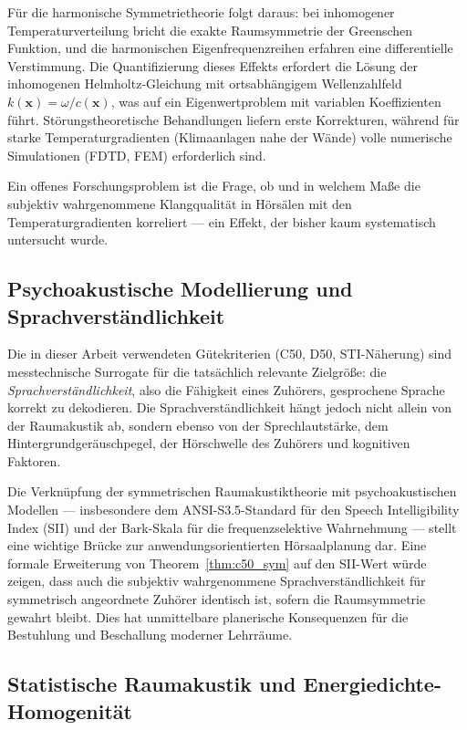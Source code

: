 ﻿\documentclass[12pt, a4paper]{article}
\theoremstyle{definition}
\theoremstyle{remark}
\begin{document}
Für die harmonische Symmetrietheorie folgt daraus: bei inhomogener
Temperaturverteilung bricht die exakte Raumsymmetrie der Greenschen
Funktion, und die harmonischen Eigenfrequenzreihen erfahren eine
differentielle Verstimmung. Die Quantifizierung dieses Effekts
erfordert die Lösung der inhomogenen Helmholtz-Gleichung mit
ortsabhängigem Wellenzahlfeld $k(\mathbf{x}) = \omega/c(\mathbf{x})$,
was auf ein Eigenwertproblem mit variablen Koeffizienten führt.
Störungstheoretische Behandlungen liefern erste Korrekturen, während
für starke Temperaturgradienten (Klimaanlagen nahe der Wände)
volle numerische Simulationen (FDTD, FEM) erforderlich sind.

Ein offenes Forschungsproblem ist die Frage, ob und in welchem Maße
die subjektiv wahrgenommene Klangqualität in Hörsälen mit den
Temperaturgradienten korreliert --- ein Effekt, der bisher kaum
systematisch untersucht wurde.

\subsection{Psychoakustische Modellierung und Sprachverständlichkeit}

Die in dieser Arbeit verwendeten Gütekriterien (C50, D50, STI-Näherung)
sind messtechnische Surrogate für die tatsächlich relevante Zielgröße:
die \emph{Sprachverständlichkeit}, also die Fähigkeit eines Zuhörers,
gesprochene Sprache korrekt zu dekodieren. Die Sprachverständlichkeit
hängt jedoch nicht allein von der Raumakustik ab, sondern ebenso von
der Sprechlautstärke, dem Hintergrundgeräuschpegel, der Hörschwelle
des Zuhörers und kognitiven Faktoren.

Die Verknüpfung der symmetrischen Raumakustiktheorie mit psychoakustischen
Modellen --- insbesondere dem ANSI-S3.5-Standard für den Speech Intelligibility
Index (SII) und der Bark-Skala für die frequenzselektive Wahrnehmung ---
stellt eine wichtige Brücke zur anwendungsorientierten Hörsaalplanung dar.
Eine formale Erweiterung von Theorem~\ref{thm:c50_sym} auf den
SII-Wert würde zeigen, dass auch die subjektiv wahrgenommene Sprachverständlichkeit
für symmetrisch angeordnete Zuhörer identisch ist, sofern die Raumsymmetrie
gewahrt bleibt. Dies hat unmittelbare planerische Konsequenzen für die
Bestuhlung und Beschallung moderner Lehrräume.

\subsection{Statistische Raumakustik und Energiedichte-Homogenität}
\end{document}
